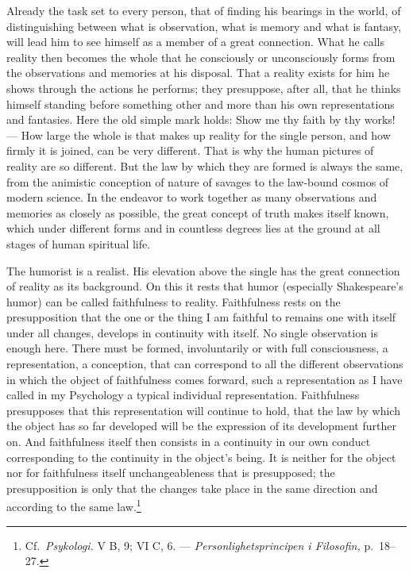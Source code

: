 \documentclass[12pt]{book}
\newcommand{\opage}[1]{\marginnote{\footnotesize\textit{[#1]}}}
\begin{document}
Already the task set to every person, that \opage{115}of finding his bearings in the world,
of distinguishing between what is observation, what is memory and what is fantasy, will
lead him to see himself as a member of a great connection. What he calls reality then
becomes the whole that he consciously or unconsciously forms from the observations and
memories at his disposal. That a reality exists for him he shows through the actions he
performs; they presuppose, after all, that he thinks himself standing before something
other and more than his own representations and fantasies. Here the old simple mark holds:
Show me thy faith by thy works! --- How large the whole is that makes up reality for the
single person, and how firmly it is joined, can be very different. That is why the human
pictures of reality are so different. But the law by which they are formed is always the
same, from the animistic conception of nature of savages to the law-bound cosmos of modern
science. In the endeavor to work together as many observations and memories as closely as
possible, the great concept of truth makes itself known, which under different forms and
in countless degrees lies at the ground at all stages of human spiritual life.

The humorist is a realist. His elevation above the single has the great connection of
reality as its background. On this it rests that humor (especially Shakespeare's humor) can
be called faithfulness to reality. Faithfulness rests on the presupposition that the one or
the thing I am faithful to remains one with itself under all changes, develops in
continuity with itself. No single observation is enough here. There must be formed,
involuntarily or with full consciousness, a representation, a conception, that can
correspond to all the different observations in which the object of faithfulness comes
forward, such a representation as I have called in my Psychology a typical individual
representation. Faithfulness presupposes that this representation will continue to hold,
that the law by which the object has so far developed will be the expression of its
development further on. And faithfulness itself then consists in a continuity in our own
conduct corresponding to the continuity in the object's being. It is neither for the object
nor for faithfulness itself unchangeableness that is presupposed; the
\opage{116}presupposition is only that the changes take place in the same direction and
according to the same law.\footnote{Cf.\ \textit{Psykologi.} V B, 9; VI C, 6. ---
\textit{Personlighetsprincipen i Filosofin,} p.~18--27.}
\end{document}
